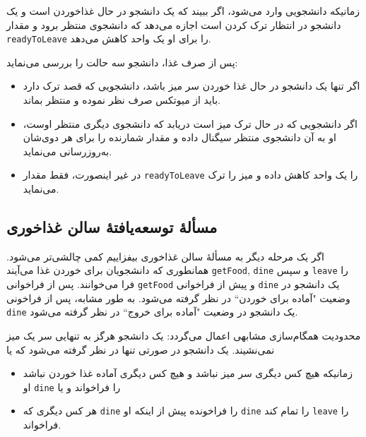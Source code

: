 \documentclass{book}
\begin{document}
    زمانیکه دانشجویی وارد می‌شود، اگر ببیند که یک دانشجو در حال غذاخوردن است و یک دانشجو در انتظار ترک کردن است اجازه می‌دهد که  دانشجوی منتظر 
    برود و مقدار  {\tt readyToLeave} را برای او یک واحد کاهش می‌دهد. 

\newpage
    پس از صرف غذا، دانشجو سه حالت را بررسی می‌نماید:

\begin{itemize}

\item
    اگر تنها یک دانشجو در حال غذا خوردن سر میز باشد، دانشجویی که قصد ترک دارد باید از میوتکس صرف نظر نموده و منتظر بماند. 

\item
    اگر دانشجویی که در حال ترک میز است دریابد که دانشجوی دیگری منتظر اوست، او به آن دانشجوی منتظر سیگنال داده و مقدار شمارنده را برای هر دوی‌شان
    به‌روزرسانی می‌نماید. 

\item
    در غیر اینصورت، فقط مقدار  {\tt readyToLeave}  را یک واحد کاهش داده و میز را ترک می‌نماید.

\end{itemize}


\subsection{مسألهٔ توسعه‌یافتهٔ سالن غذاخوری}

    اگر یک مرحله دیگر به مسألهٔ سالن غذاخوری  بیفزاییم کمی چالشی‌تر می‌شود. 
    همانطوری که دانشجویان برای خوردن غذا می‌آیند {\tt getFood}, {\tt dine}  و سپس {\tt leave} را فرا می‌خوانند. 
    پس از فراخوانی {\tt getFood}  و پیش از فراخوانی {\tt dine} یک دانشجو در وضعیت "آماده برای خوردن`` در نظر گرفته می‌شود. 
    به طور مشابه، پس از فراخونی {\tt dine} یک دانشجو در وضعیت "آماده برای خروج`` در نظر گرفته می‌شود. 

    محدودیت همگام‌سازی مشابهی اعمال می‌گردد: 
    یک دانشجو هرگز به تنهایی سر یک میز نمی‌نشیند. یک دانشجو در صورتی تنها در نظر گرفته می‌شود که یا 

\begin{itemize}

\item
    زمانیکه هیچ کس دیگری سر میز نباشد و هیچ کس دیگری آماده غذا خوردن نباشد او {\tt dine} را فراخواند و یا 

\item
    هر کس دیگری که {\tt dine} را فراخونده پیش از اینکه او {\tt dine} را تمام کند {\tt leave} را فراخواند. 

\end{itemize}
\end{document}
